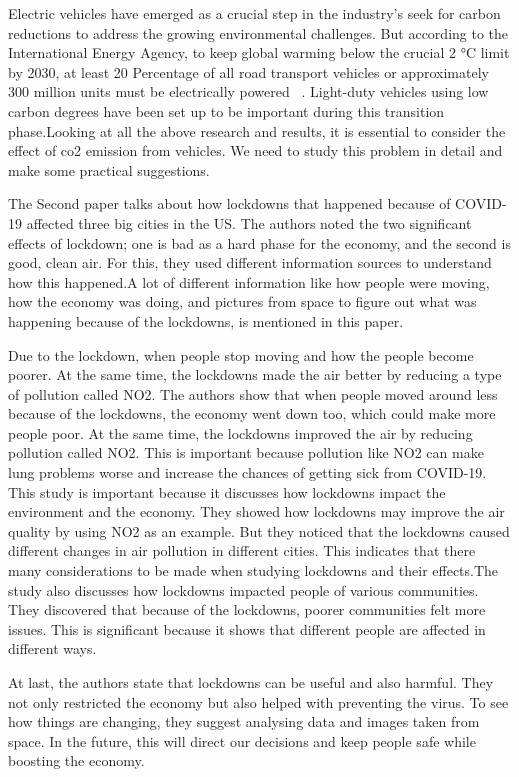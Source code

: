 \documentclass[12pt, a4paper,oneside]{book}
\numberwithin{equation}{section}
\begin{document}
Electric vehicles have emerged as a crucial step in the industry's seek for carbon reductions to address the growing environmental challenges. But according to the International Energy Agency, to keep global warming below the crucial 2 °C limit by 2030, at least 20 Percentage of all road transport vehicles or approximately 300 million units must be electrically powered ~\cite{ref5}. Light-duty vehicles using low carbon degrees have been set up to be important during this transition phase.Looking at all the above research and results, it is essential to consider the effect of co2 emission from vehicles. We need to study this problem in detail and make some practical suggestions.


The Second paper talks about how lockdowns that happened because of COVID-19 affected three big cities in the US. The authors noted the two significant effects of lockdown; one is bad as a hard phase for the economy, and the second is good, clean air. For this, they used different information sources to understand how this happened.A lot of different information like how people were moving, how the economy was doing, and pictures from space to figure out what was happening because of the lockdowns, is mentioned in this paper.~\cite{ref2}

Due to the lockdown, when people stop moving and how the people become poorer. At the same time, the lockdowns made the air better by reducing a type of pollution called NO2.
The authors show that when people moved around less because of the lockdowns, the economy went down too, which could make more people poor. At the same time, the lockdowns improved the air by reducing pollution called NO2. 
This is important because pollution like NO2 can make lung problems worse and increase the chances of getting sick from COVID-19.
This study is important because it discusses how lockdowns impact the environment and the economy. They showed how lockdowns may improve the air quality by using NO2 as an example. But they noticed that the lockdowns caused different changes in air pollution in different cities. This indicates that there many considerations to be made when studying lockdowns and their effects.The study also discusses how lockdowns impacted people of various communities. They discovered that because of the lockdowns, poorer communities felt more issues. This is significant because it shows that different people are affected in different ways.~\cite{ref2}

At last, the authors state that lockdowns can be useful and  also harmful.  They not only restricted the economy but also helped with preventing the virus. To see how things are changing, they suggest analysing data and images taken from space. In the future, this will direct our decisions and keep people safe while boosting the economy.~\cite{ref2}
\end{document}

